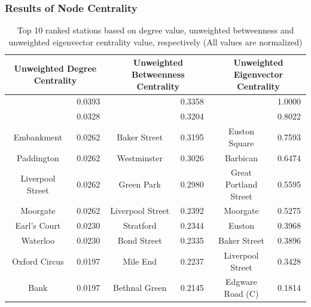 \documentclass[a4paper,reqno,]{article}
\begin{document}
\subsubsection{Results of Node Centrality}

\begin{table}[H]
 \caption{Top 10 ranked stations based on degree value, unweighted betweenness and unweighted eigenvector centrality value, respectively (All values are normalized)}
 \label{tab:keystation1}
 \begin{center}
 \begin{tabular}{*{6}{c}}
  \toprule
   \multicolumn{2}{c}{Unweighted Degree Centrality} & \multicolumn{2}{c}{Unweighted Betweenness Centrality} & \multicolumn{2}{c}{Unweighted Eigenvector Centrality}\\
  \midrule
   \rowcolor{Gray}\cellcolor{Gray}{King's Cross St. Pancras} & 0.0393 & \cellcolor{Gray}{Waterloo} & 0.3358 & \cellcolor{Gray}{King's Cross St. Pancras} & 1.0000 \\
   \rowcolor{Gray}\cellcolor{Gray}{Baker Street} & 0.0328 & \cellcolor{Gray}{Bank}  & 0.3204 & \cellcolor{Gray}{Farringdon} & 0.8022 \\
    Embankment & 0.0262 & Baker Street & 0.3195 & Euston Square & 0.7593 \\
    Paddington & 0.0262 & Westminster & 0.3026 & Barbican & 0.6474 \\
    Liverpool Street & 0.0262 & Green Park & 0.2980 & Great Portland Street & 0.5595 \\
    Moorgate & 0.0262 & Liverpool Street & 0.2392 & Moorgate & 0.5275 \\
    Earl's Court & 0.0230 & Stratford & 0.2344 & Euston & 0.3968 \\
    Waterloo & 0.0230 & Bond Street & 0.2335 & Baker Street & 0.3896 \\
    Oxford Circus & 0.0197 & Mile End & 0.2237 & Liverpool Street & 0.3428 \\
    Bank  & 0.0197 & Bethnal Green & 0.2145 & Edgware Road (C) & 0.1814 \\
  \bottomrule
 \end{tabular}
 \end{center}
\end{table}
\end{document}
